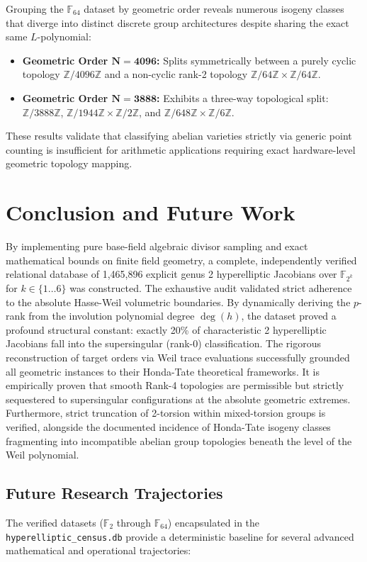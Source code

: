 \documentclass[11pt,letterpaper]{article}
\begin{document}
Grouping the $\mathbb{F}_{64}$ dataset by geometric order reveals numerous isogeny classes that diverge into distinct discrete group architectures despite sharing the exact same $L$-polynomial:
\begin{itemize}
\item \textbf{Geometric Order $\mathbf{N=4096}$:} Splits symmetrically between a purely cyclic topology $\mathbb{Z}/4096\mathbb{Z}$ and a non-cyclic rank-2 topology $\mathbb{Z}/64\mathbb{Z} \times \mathbb{Z}/64\mathbb{Z}$.
\item \textbf{Geometric Order $\mathbf{N=3888}$:} Exhibits a three-way topological split: $\mathbb{Z}/3888\mathbb{Z}$, $\mathbb{Z}/1944\mathbb{Z} \times \mathbb{Z}/2\mathbb{Z}$, and $\mathbb{Z}/648\mathbb{Z} \times \mathbb{Z}/6\mathbb{Z}$.
\end{itemize}
These results validate that classifying abelian varieties strictly via generic point counting is insufficient for arithmetic applications requiring exact hardware-level geometric topology mapping. 

\section{Conclusion and Future Work}
By implementing pure base-field algebraic divisor sampling and exact mathematical bounds on finite field geometry, a complete, independently verified relational database of 1,465,896 explicit genus 2 hyperelliptic Jacobians over $\mathbb{F}_{2^k}$ for $k \in \{1 \dots 6\}$ was constructed. The exhaustive audit validated strict adherence to the absolute Hasse-Weil volumetric boundaries. By dynamically deriving the $p$-rank from the involution polynomial degree $\deg(h)$, the dataset proved a profound structural constant: exactly 20\% of characteristic 2 hyperelliptic Jacobians fall into the supersingular (rank-0) classification. The rigorous reconstruction of target orders via Weil trace evaluations successfully grounded all geometric instances to their Honda-Tate theoretical frameworks. It is empirically proven that smooth Rank-4 topologies are permissible but strictly sequestered to supersingular configurations at the absolute geometric extremes. Furthermore, strict truncation of 2-torsion within mixed-torsion groups is verified, alongside the documented incidence of Honda-Tate isogeny classes fragmenting into incompatible abelian group topologies beneath the level of the Weil polynomial. 

\subsection{Future Research Trajectories}
The verified datasets ($\mathbb{F}_2$ through $\mathbb{F}_{64}$) encapsulated in the \texttt{hyperelliptic\_census.db} provide a deterministic baseline for several advanced mathematical and operational trajectories:
\end{document}
